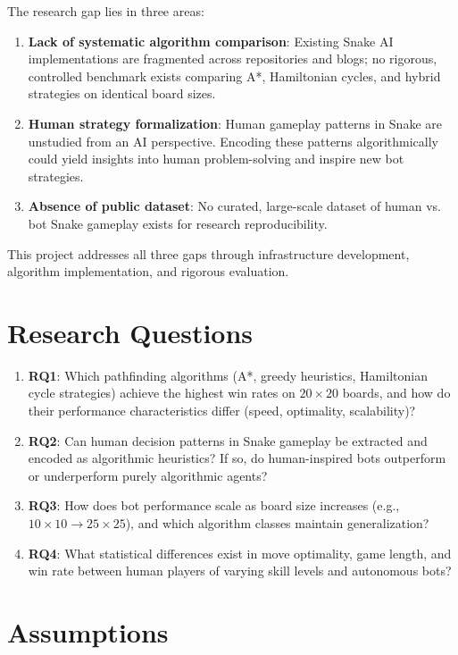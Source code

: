 \documentclass[11pt,a4paper]{article}
\begin{document}
The research gap lies in three areas:

\begin{enumerate}
    \item \textbf{Lack of systematic algorithm comparison}: Existing Snake AI implementations are fragmented across repositories and blogs; no rigorous, controlled benchmark exists comparing A*, Hamiltonian cycles, and hybrid strategies on identical board sizes.
    \item \textbf{Human strategy formalization}: Human gameplay patterns in Snake are unstudied from an AI perspective. Encoding these patterns algorithmically could yield insights into human problem-solving and inspire new bot strategies.
    \item \textbf{Absence of public dataset}: No curated, large-scale dataset of human vs. bot Snake gameplay exists for research reproducibility.
\end{enumerate}

This project addresses all three gaps through infrastructure development, algorithm implementation, and rigorous evaluation.

\section{Research Questions}

\begin{enumerate}
    \item \textbf{RQ1}: Which pathfinding algorithms (A*, greedy heuristics, Hamiltonian cycle strategies) achieve the highest win rates on $20 \times 20$ boards, and how do their performance characteristics differ (speed, optimality, scalability)?
    \item \textbf{RQ2}: Can human decision patterns in Snake gameplay be extracted and encoded as algorithmic heuristics? If so, do human-inspired bots outperform or underperform purely algorithmic agents?
    \item \textbf{RQ3}: How does bot performance scale as board size increases (e.g., $10 \times 10 \to 25 \times 25$), and which algorithm classes maintain generalization?
    \item \textbf{RQ4}: What statistical differences exist in move optimality, game length, and win rate between human players of varying skill levels and autonomous bots?
\end{enumerate}

\section{Assumptions}
\end{document}
